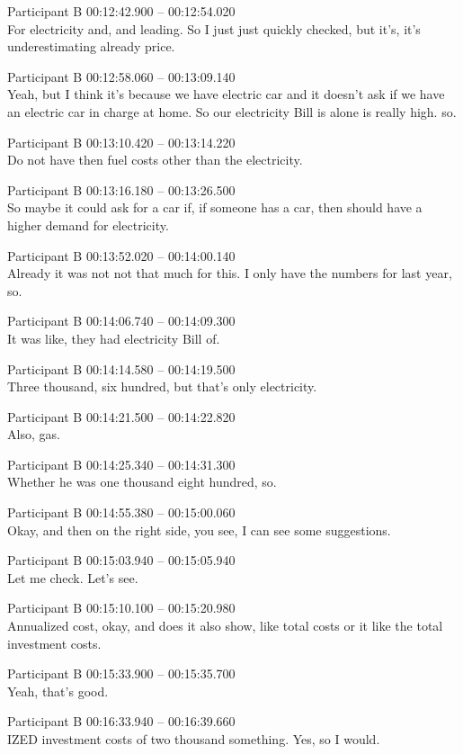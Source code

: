 {Participant B 00:12:42.900 -- 00:12:54.020 \\
For electricity and, and leading. So I just just quickly checked, but it's, it's underestimating already price.

Participant B 00:12:58.060 -- 00:13:09.140 \\
Yeah, but I think it's because we have electric car and it doesn't ask if we have an electric car in charge at home. So our electricity Bill is alone is really high. so.

Participant B 00:13:10.420 -- 00:13:14.220 \\
Do not have then fuel costs other than the electricity.

Participant B 00:13:16.180 -- 00:13:26.500 \\
So maybe it could ask for a car if, if someone has a car, then should have a higher demand for electricity.

Participant B 00:13:52.020 -- 00:14:00.140 \\
Already it was not not that much for this. I only have the numbers for last year, so.

Participant B 00:14:06.740 -- 00:14:09.300 \\
It was like, they had electricity Bill of.

Participant B 00:14:14.580 -- 00:14:19.500 \\
Three thousand, six hundred, but that's only electricity.

Participant B 00:14:21.500 -- 00:14:22.820 \\
Also, gas.

Participant B 00:14:25.340 -- 00:14:31.300 \\
Whether he was one thousand eight hundred, so.

Participant B 00:14:55.380 -- 00:15:00.060 \\
Okay, and then on the right side, you see, I can see some suggestions.

Participant B 00:15:03.940 -- 00:15:05.940 \\
Let me check. Let's see.

Participant B 00:15:10.100 -- 00:15:20.980 \\
Annualized cost, okay, and does it also show, like total costs or it like the total investment costs.

Participant B 00:15:33.900 -- 00:15:35.700 \\
Yeah, that's good.

Participant B 00:16:33.940 -- 00:16:39.660 \\
IZED investment costs of two thousand something. Yes, so I would.

}
